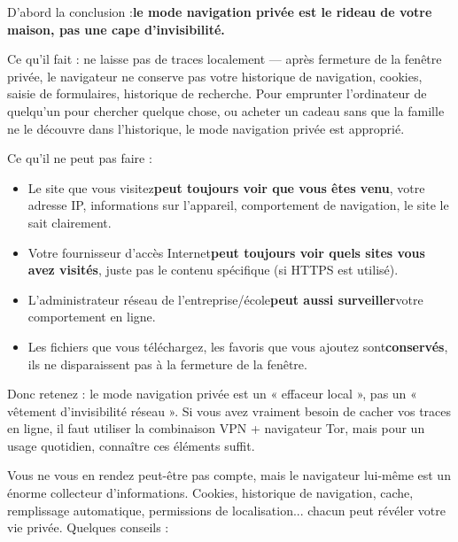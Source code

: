
D'abord la conclusion :\textbf{le mode navigation privée est le rideau de votre maison, pas une cape d'invisibilité.}

Ce qu'il fait : ne laisse pas de traces localement — après fermeture de la fenêtre privée, le navigateur ne conserve pas votre historique de navigation, cookies, saisie de formulaires, historique de recherche. Pour emprunter l'ordinateur de quelqu'un pour chercher quelque chose, ou acheter un cadeau sans que la famille ne le découvre dans l'historique, le mode navigation privée est approprié.

Ce qu'il ne peut pas faire :

\begin{itemize}
  \item Le site que vous visitez\textbf{peut toujours voir que vous êtes venu}, votre adresse IP, informations sur l'appareil, comportement de navigation, le site le sait clairement.
  \item Votre fournisseur d'accès Internet\textbf{peut toujours voir quels sites vous avez visités}, juste pas le contenu spécifique (si HTTPS est utilisé).
  \item L'administrateur réseau de l'entreprise/école\textbf{peut aussi surveiller}votre comportement en ligne.
  \item Les fichiers que vous téléchargez, les favoris que vous ajoutez sont\textbf{conservés}, ils ne disparaissent pas à la fermeture de la fenêtre.
\end{itemize}

Donc retenez : le mode navigation privée est un « effaceur local », pas un « vêtement d'invisibilité réseau ». Si vous avez vraiment besoin de cacher vos traces en ligne, il faut utiliser la combinaison VPN + navigateur Tor, mais pour un usage quotidien, connaître ces éléments suffit.


Vous ne vous en rendez peut-être pas compte, mais le navigateur lui-même est un énorme collecteur d'informations. Cookies, historique de navigation, cache, remplissage automatique, permissions de localisation... chacun peut révéler votre vie privée. Quelques conseils :

